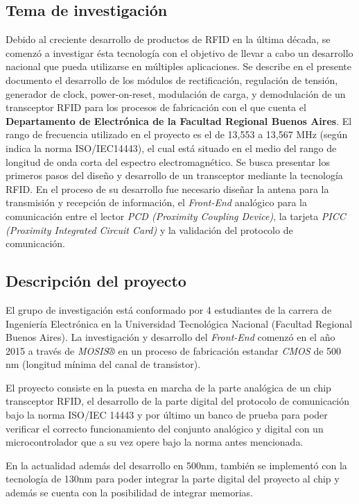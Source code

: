 \subsection{Tema de investigación}
Debido al creciente desarrollo de productos de RFID en la última década, se comenzó a investigar ésta tecnología con el objetivo de llevar a cabo un desarrollo nacional que pueda utilizarse en múltiples aplicaciones. Se describe en el presente documento el desarrollo de los módulos de rectificación, regulación de tensión, generador de clock, power-on-reset, modulación de carga, y demodulación de un transceptor RFID para los procesos de fabricación con el que cuenta el \textbf{Departamento de Electrónica de la Facultad Regional Buenos Aires}.
El rango de frecuencia utilizado en el proyecto es el de 13,553 a 13,567 MHz (según indica la norma ISO/IEC14443), el cual está situado en el medio del rango de longitud de onda corta del espectro electromagnético.
Se busca presentar los primeros pasos del diseño y desarrollo de un transceptor mediante la tecnología RFID. En el proceso de su desarrollo fue necesario diseñar la antena para la transmisión y recepción de información, el \textit{Front-End} analógico para la comunicación entre el lector \textit{PCD (Proximity Coupling Device)}, la tarjeta \textit{PICC (Proximity Integrated Circuit Card)} y la validación del protocolo de comunicación.

\subsection{Descripción del proyecto}

El grupo de investigación está conformado por 4 estudiantes de la carrera de Ingeniería Electrónica en la Universidad Tecnológica Nacional (Facultad Regional Buenos Aires). La investigación y desarrollo del \textit{Front-End} comenzó en el año 2015 a través de \textit{MOSIS®} en un proceso de fabricación estandar \textit{CMOS} de 500 nm (longitud mínima del canal de transistor).

El proyecto consiste en la puesta en marcha de la parte analógica de un chip transceptor RFID, el desarrollo de la parte digital del protocolo de comunicación bajo la norma ISO/IEC 14443 y por último un banco de prueba para poder verificar el correcto funcionamiento del conjunto analógico y digital con un microcontrolador que a su vez opere bajo la norma antes mencionada.

En la actualidad además del desarrollo en 500nm, también se implementó con la tecnología de 130nm para poder integrar la parte digital del proyecto al chip y además se cuenta con la posibilidad de integrar memorias.

